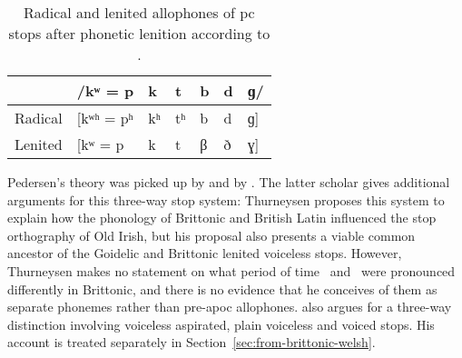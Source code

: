 \begin{table}[h]
  \centering
  \begin{tabular}{lllllll}
    \toprule
    &/kʷ = p & k & t & b & d & ɡ/ \\\midrule
    Radical &[kʷʰ = pʰ& kʰ& tʰ& b & d & ɡ] \\ 
    Lenited &[kʷ = p & k & t & β & ð & ɣ]\\
    \bottomrule
  \end{tabular}
  \caption{Radical and lenited allophones of \gls{pc} stops after phonetic lenition according to \textcite[§§~149,~303]{Ped_Vergleichende09}.}
  \label{tab:pedersenstops}
\end{table}


Pedersen's theory was picked up by \textcite[§~245]{Bau_Grammar24} and by \textcite[§~915]{Thu_grammar46}. The latter scholar gives additional arguments for this three-way stop system:
Thurneysen proposes this system  to explain how the phonology of Brittonic and British Latin influenced the stop orthography of Old Irish, but his proposal also presents  a viable common ancestor of the Goidelic and Brittonic lenited voiceless stops. However, Thurneysen makes no statement on what period of time  \lT\ and \xD\ were pronounced differently in Brittonic, and there is no evidence that he conceives of them as separate phonemes rather than pre-\gls{apoc} allophones. \Textcite{koch_*cothairche_1990} also argues for a three-way distinction involving voiceless aspirated, plain voiceless and voiced stops. His account is treated separately in Section~\ref{sec:from-brittonic-welsh}.

